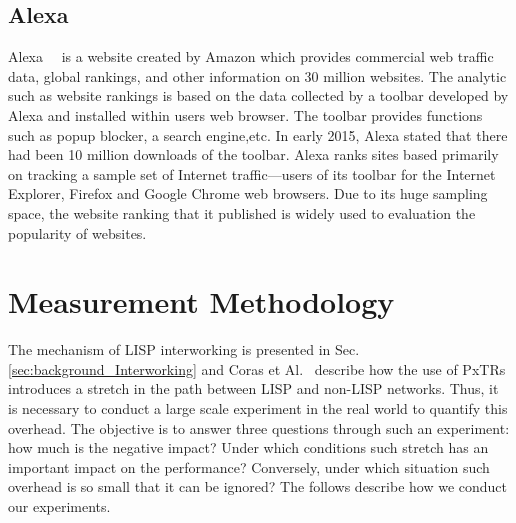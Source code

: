 \subsection{Alexa}
\label{subsec:alexa}
Alexa~\cite{alexa}~\cite{alexatop} is a website created by Amazon which provides commercial web traffic data, global rankings, and other information on 30 million websites. The analytic such as website rankings is based on the data collected by a toolbar developed by Alexa and installed within users web browser. The toolbar  
provides functions such as popup blocker, a search engine,etc. In early 2015, Alexa stated that there had been 10 million downloads of the toolbar.
Alexa ranks sites based primarily on tracking a sample set of Internet traffic—users of its toolbar for the Internet Explorer, Firefox and Google Chrome web browsers. Due to its huge sampling space, the website ranking that it published is widely used to evaluation the popularity of websites.


\section{Measurement Methodology}
\label{sec:pxtr_methodology}
The mechanism of LISP interworking is presented in Sec.\ref{sec:background_Interworking} and Coras et Al.~\cite{coras2014performance} describe how the use of PxTRs introduces a stretch in the path between LISP and non-LISP networks. Thus, it is necessary to conduct a large scale experiment in the real world to quantify this overhead. The objective is to answer three questions through such an experiment: how much is the negative impact? Under which conditions such stretch has an important impact on the performance? Conversely, under which situation such overhead is so small that it can be ignored? The follows describe how we conduct our experiments.

